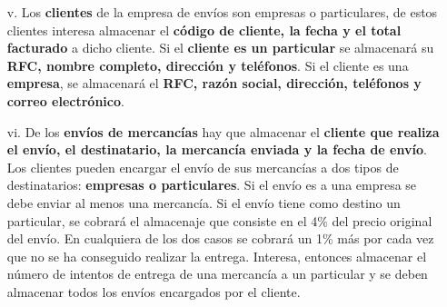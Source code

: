 \documentclass[12pt, letterpaper]{article}
\begin{document}
\begin{itemize}
{                        la república}. Si las mercancías son al \textbf{interior
                        de la república}, entonces se les \textbf{asignará
                        adicionalmente un avión}. No puede haber mercancías que
                        se envíen al interior de la república que no tengan
                        asignado avión. Un avión puede tener asignadas varias o 
                        ninguna mercancía de larga distancia. Una mercancía de
                        larga distancia debe tener asignada su correspondiente
                        moto o van para llevarla empresa/aeropuerto/destino final.
                \item[v.] Los \textbf{clientes} de la empresa de envíos son empresas
                        o particulares, de estos clientes interesa almacenar el
                        \textbf{código de cliente, la fecha y el total facturado}
                        a dicho cliente. Si el \textbf{cliente es un particular}
                        se almacenará su \textbf{RFC, nombre completo, dirección
                        y teléfonos}. Si el cliente es una \textbf{empresa}, se
                        almacenará el \textbf{RFC, razón social, dirección, 
                        teléfonos y correo electrónico}. 
                \item[vi.] De los \textbf{envíos de mercancías} hay que almacenar el \textbf{cliente 
                        que realiza el envío, el destinatario, la mercancía 
                        enviada y la fecha de envío}. Los clientes pueden encargar 
                        el envío de sus mercancías a dos tipos de destinatarios: 
                        \textbf{empresas o particulares}. Si el envío es a una empresa 
                        se debe enviar al menos una mercancía. Si el envío tiene 
                        como destino un particular, se cobrará el almacenaje que 
                        consiste en el 4\% del precio original del envío. En 
                        cualquiera de los dos casos se cobrará un 1\% más por 
                        cada vez que no se ha conseguido realizar la entrega. Interesa,
                        entonces almacenar el número de intentos de entrega de una 
                        mercancía a un particular y se deben almacenar todos los 
                        envíos encargados por el cliente.    
            \end{itemize}
\end{document}

